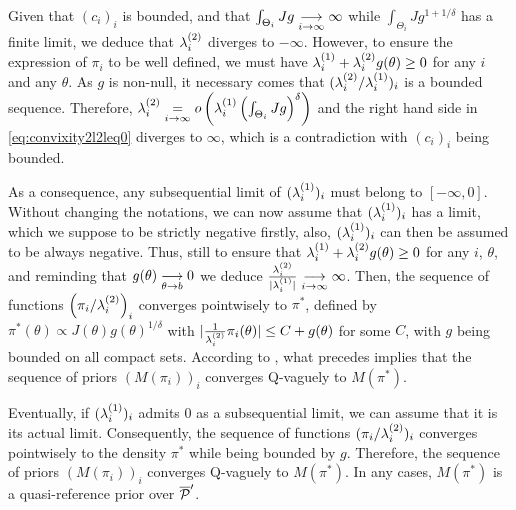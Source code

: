%
 Given that $(c_i)_i$ is bounded, and that $\int_{\Theta_i}Jg\overset{\ }{\underset{i\rightarrow\infty}{\longrightarrow}}\infty$ while $\int_{\Theta_i}Jg^{1+1/\delta}$ has a finite limit, we deduce that $\lambda_i^{(2)}$ diverges to $-\infty$.
 However, to ensure the expression of $\pi_i$ to be well defined, we must have $\lambda_i^{(1)}+\lambda_i^{(2)}g(\theta)\geq0$ for any $i$ and any $\theta$. As $g$ is non-null, it necessary comes that $(\lambda_i^{(2)}/\lambda_i^{(1)})_i$ is a  bounded sequence.
Therefore, 
$\lambda_i^{(2)} \overset{}{\underset{i\rightarrow\infty}{=}} o\left(\lambda_i^{(1)}\left(\int_{\Theta_i}Jg\right)^\delta\right) $
and the right hand side in \cref{eq:convixity2l2leq0} diverges to $\infty$, which is a contradiction with $(c_i)_i$ being bounded.

As a consequence, any subsequential limit of $(\lambda_i^{(1)})_i$ must belong to $[-\infty,0]$. Without changing the notations, we can now assume that $(\lambda_i^{(1)})_i$ has a limit, which we suppose to be strictly negative firstly, also, $(\lambda_i^{(1)})_i$ can then be assumed to be always negative.
 Thus, still to ensure that $\lambda_i^{(1)}+\lambda_i^{(2)}g(\theta)\geq0$ for any $i$, $\theta$, and reminding that $g(\theta)\overset{\ }{\underset{\theta\rightarrow b}{\longrightarrow}}0$ we deduce $\frac{\lambda_i^{(2)}}{|\lambda_i^{(1)}|}\overset{\ }{\underset{i\rightarrow\infty}{\longrightarrow}}\infty$.
 Then, 
 the sequence of functions $\left(\pi_i/\lambda_i^{(2)}\right)_i$ converges pointwisely to $\pi^\ast$, defined by $\pi^\ast(\theta)\propto J(\theta)g(\theta)^{1/\delta}$ with  $|\frac{1}{\lambda_i^{(2)}}\pi_i(\theta)|\leq C+g(\theta)$ for some $C$, with $g$ being bounded on all compact sets. %
According to \cite[Proposition 2.15]{bioche_approximation_2016}, what precedes implies that the sequence of priors $(M(\pi_i))_i$ converges Q-vaguely to $M(\pi^\ast)$.

Eventually, if $(\lambda_i^{(1)})_i$ admits $0$ as a subsequential limit, 
we can assume that it is its actual limit.
Consequently,  the sequence of functions $(\pi_i/\lambda_i^{(2)})_i$ converges pointwisely to the density $\pi^\ast$ while being bounded  by $g$. Therefore, the sequence of priors $(M(\pi_i))_i$ converges Q-vaguely to $M(\pi^\ast)$.
%
In any cases, $M(\pi^\ast)$ is a quasi-reference prior over $\overline{\mathcal{P}}'$.

 
 
